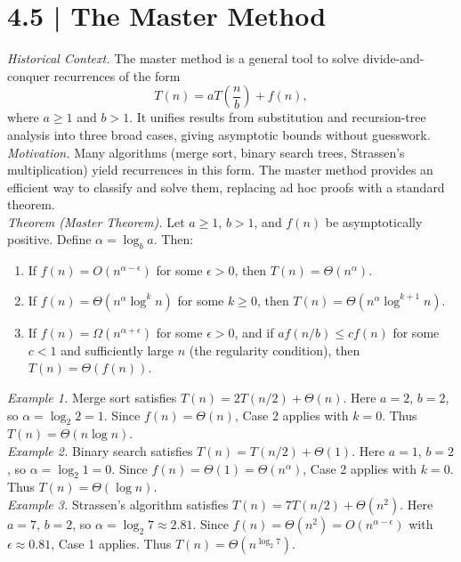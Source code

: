 \documentclass[12pt]{article}
\newcommand{\microhead}[1]{\vspace{0.45em}\noindent\textit{#1}}
\theoremstyle{definition}
\begin{document}
\newpage

\dotfill
\section*{4.5 | The Master Method}
\dotfill

\microhead{Historical Context.} The master method is a general tool to solve divide-and-conquer recurrences of the form
\[
T(n) = aT\!\left(\frac{n}{b}\right) + f(n),
\]
where $a \ge 1$ and $b > 1$. It unifies results from substitution and recursion-tree analysis into three broad cases, giving asymptotic bounds without guesswork. \\

\microhead{Motivation.} Many algorithms (merge sort, binary search trees, Strassen’s multiplication) yield recurrences in this form. The master method provides an efficient way to classify and solve them, replacing ad hoc proofs with a standard theorem. \\

\microhead{Theorem (Master Theorem).} Let $a \ge 1$, $b > 1$, and $f(n)$ be asymptotically positive. Define $\alpha = \log_b a$. Then:
\begin{enumerate}
\item If $f(n) = O(n^{\alpha - \epsilon})$ for some $\epsilon > 0$, then $T(n) = \Theta(n^\alpha)$.
\item If $f(n) = \Theta(n^\alpha \log^k n)$ for some $k \ge 0$, then $T(n) = \Theta(n^\alpha \log^{k+1} n)$.
\item If $f(n) = \Omega(n^{\alpha + \epsilon})$ for some $\epsilon > 0$, and if $af(n/b) \le c f(n)$ for some $c < 1$ and sufficiently large $n$ (the regularity condition), then $T(n) = \Theta(f(n))$.
\end{enumerate} 

\microhead{Example 1.} Merge sort satisfies $T(n) = 2T(n/2) + \Theta(n)$. Here $a=2$, $b=2$, so $\alpha = \log_2 2 = 1$. Since $f(n) = \Theta(n)$, Case 2 applies with $k=0$. Thus $T(n) = \Theta(n \log n)$. \\

\microhead{Example 2.} Binary search satisfies $T(n) = T(n/2) + \Theta(1)$. Here $a=1$, $b=2$, so $\alpha = \log_2 1 = 0$. Since $f(n) = \Theta(1) = \Theta(n^\alpha)$, Case 2 applies with $k=0$. Thus $T(n) = \Theta(\log n)$. \\

\microhead{Example 3.} Strassen’s algorithm satisfies $T(n) = 7T(n/2) + \Theta(n^2)$. Here $a=7$, $b=2$, so $\alpha = \log_2 7 \approx 2.81$. Since $f(n) = \Theta(n^2) = O(n^{\alpha-\epsilon})$ with $\epsilon \approx 0.81$, Case 1 applies. Thus $T(n) = \Theta(n^{\log_2 7})$. \\
\end{document}

